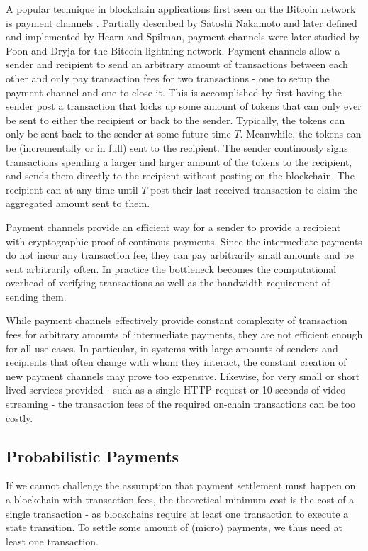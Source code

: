 A popular technique in blockchain applications first seen on the Bitcoin network is payment channels \cite{PaymentChannels}. Partially described by Satoshi Nakamoto\cite{Satoshi} and later defined and implemented by Hearn and Spilman\cite{BitcoinWikiContracts}, payment channels were later studied by Poon and Dryja\cite{PoonDryja} for the Bitcoin lightning network. Payment channels allow a sender and recipient to send an arbitrary amount of transactions between each other and only pay transaction fees for two transactions - one to setup the payment channel and one to close it. This is accomplished by first having the sender post a transaction that locks up some amount of tokens that can only ever be sent to either the recipient or back to the sender. Typically, the tokens can only be sent back to the sender at some future time $T$. Meanwhile, the tokens can be (incrementally or in full) sent to the recipient. The sender continously signs transactions spending a larger and larger amount of the tokens to the recipient, and sends them directly to the recipient without posting on the blockchain. The recipient can at any time until $T$ post their last received transaction to claim the aggregated amount sent to them.

Payment channels provide an efficient way for a sender to provide a recipient with cryptographic proof of continous payments. Since the intermediate payments do not incur any transaction fee, they can pay arbitrarily small amounts and be sent arbitrarily often. In practice the bottleneck becomes the computational overhead of verifying transactions as well as the bandwidth requirement of sending them.

While payment channels effectively provide constant complexity of transaction fees for arbitrary amounts of intermediate payments, they are not efficient enough for all use cases. In particular, in systems  with large amounts of senders and recipients that often change with whom they interact, the constant creation of new payment channels may prove too expensive. Likewise, for very small or short lived services provided - such as a single HTTP request or 10 seconds of video streaming - the transaction fees of the required on-chain transactions can be too costly.

\subsection{Probabilistic Payments}

If we cannot challenge the assumption that payment settlement must happen on a blockchain with transaction fees, the theoretical minimum cost is the cost of a single transaction - as blockchains require at least one transaction to execute a state transition. To settle some amount of (micro) payments, we thus need at least one transaction.

